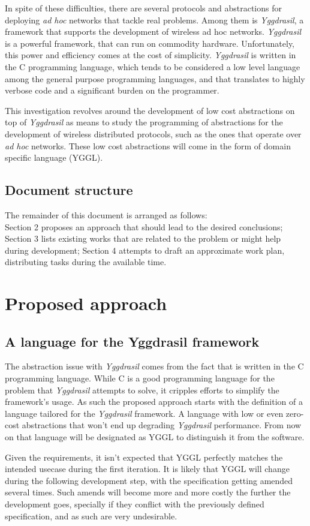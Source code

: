 \documentclass[runningheads]{llncs}
\begin{document}
\par In spite of these difficulties, there are several protocols and abstractions for deploying \textit{ad hoc} networks that tackle real problems. Among them is \textit{Yggdrasil}, a framework that supports the development of wireless ad hoc networks.
\textit{Yggdrasil} is a powerful framework, that can run on commodity hardware. Unfortunately, this power and efficiency comes at the cost of simplicity.
\textit{Yggdrasil} is written in the C programming language, which tends to be considered a low level language among the general purpose programming languages, and that translates to highly verbose code and a significant burden on the programmer.
\par This investigation revolves around the development of low cost abstractions on top of \textit{Yggdrasil} as means to study the programming of abstractions for the development of wireless distributed protocols, such as the ones that operate over \textit{ad hoc} networks.
These low cost abstractions will come in the form of domain specific language (YGGL).
\subsection*{Document structure}
The remainder of this document is arranged as follows:\\
Section 2 proposes an approach that should lead to the desired conclusions; Section 3 lists existing works that are related to the problem or might help during development; Section 4 attempts to draft an approximate work plan, distributing tasks during the available time.
\clearpage

\section{Proposed approach}
\subsection{A language for the Yggdrasil framework}
The abstraction issue with \textit{Yggdrasil} comes from the fact that is written in the C programming language. While C is a good programming language for the problem that \textit{Yggdrasil} attempts to solve, it cripples efforts to simplify the framework's usage. As such the proposed approach starts with the definition of a language tailored for the \textit{Yggdrasil} framework. A language with low or even zero-cost abstractions that won't end up degrading \textit{Yggdrasil} performance. From now on that language will be designated as YGGL to distinguish it from the software.
\par Given the requirements, it isn't expected that YGGL perfectly matches the intended usecase during the first iteration. It is likely that YGGL will change during the following development step, with the specification getting amended several times. Such amends will become more and more costly the further the development goes, specially if they conflict with the previously defined specification, and as such are very undesirable.
\end{document}
